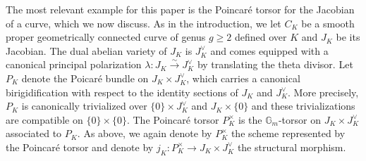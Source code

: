 \documentclass[11pt,oneside]{amsart}
\theoremstyle{plain}
\theoremstyle{definition}
\def\lra{{\longrightarrow}}
\def\G{{\bf G}}
\def\G{\mathbb{G}}
\def\oh{\mathcal{O}}
\begin{document}
The most relevant example for this paper is the Poincar\'e torsor for the Jacobian of a curve, which we now discuss. As in the introduction, we let $C_K$ be a smooth proper geometrically connected curve of genus $g\geq 2$ defined over $K$ and $J_K$ be its Jacobian. The dual abelian variety of $J_K$ is  $J_K^\vee$ and comes equipped with a canonical principal polarization $\lambda : J_K\overset{\sim}{\lra} J_K^\vee$ by translating the theta divisor. 
Let $P_K$ denote the Poicar\'e bundle on $J_K\times J_K^\vee$, which carries a canonical birigidification with respect to the identity sections of $J_K$ and $J_K^\vee$. More precisely, $P_K$ is canonically trivialized over $\{0 \}\times J_K^\vee$ and $J_K\times \{ 0 \}$ and these trivializations are compatible on $\{0 \}\times\{0 \}$. The Poincar\'e torsor $P_K^\times$ is the $\G_m$-torsor on $J_K\times J_K^\vee$ associated to $P_K$. As above, we again denote by $P_K^\times$ the scheme represented by the Poincar\'e torsor and  denote by $j_K : P_K^\times \lra J_K\times J_K^\vee$ the structural morphism.

\end{document}
